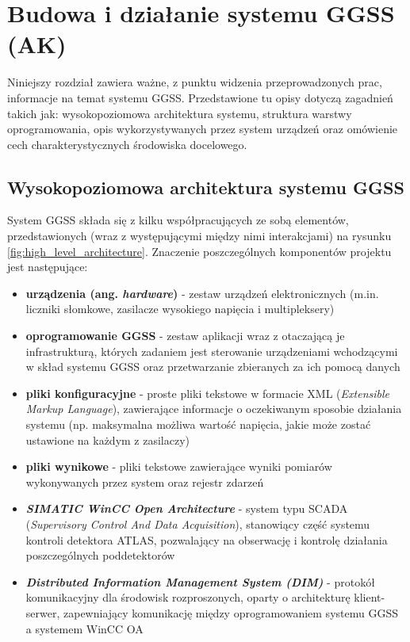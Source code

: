 \chapter{Budowa i działanie systemu GGSS (AK)}
\label{cha:ggss}

\graphicspath{{3_ggss_introduction/static/}}

Niniejszy rozdział zawiera ważne, z punktu widzenia przeprowadzonych prac, informacje na temat systemu GGSS. Przedstawione tu opisy dotyczą zagadnień takich jak: wysokopoziomowa architektura systemu, struktura warstwy oprogramowania, opis wykorzystywanych przez system urządzeń oraz omówienie cech charakterystycznych środowiska docelowego. 

\section{Wysokopoziomowa architektura systemu GGSS}
System GGSS składa się z kilku współpracujących ze sobą elementów, przedstawionych (wraz z występującymi między nimi interakcjami) na rysunku \ref{fig:high_level_architecture}. Znaczenie poszczególnych komponentów projektu jest następujące:
\begin{itemize}
    \item \textbf{urządzenia (ang. \emph{hardware})} - zestaw urządzeń elektronicznych (m.in. liczniki słomkowe, zasilacze wysokiego napięcia i multipleksery)
    \item \textbf{oprogramowanie GGSS} - zestaw aplikacji wraz z otaczającą je infrastrukturą, których zadaniem jest sterowanie urządzeniami wchodzącymi w skład systemu GGSS oraz przetwarzanie zbieranych za ich pomocą danych
    \item \textbf{pliki konfiguracyjne} - proste pliki tekstowe w formacie XML (\emph{Extensible Markup Language}), zawierające informacje o oczekiwanym sposobie działania systemu (np. maksymalna możliwa wartość napięcia, jakie może zostać ustawione na każdym z zasilaczy)
    \item \textbf{pliki wynikowe} - pliki tekstowe zawierające wyniki pomiarów wykonywanych przez system oraz rejestr zdarzeń 
    \item \emph{\textbf{SIMATIC WinCC Open Architecture}} - system typu SCADA (\emph{Supervisory Control And Data Acquisition}), stanowiący część systemu kontroli detektora ATLAS, pozwalający na obserwację i kontrolę działania poszczególnych poddetektorów
    \item \emph{\textbf{Distributed Information Management System (DIM)}} - protokół komunikacyjny dla środowisk rozproszonych, oparty o architekturę klient-serwer, zapewniający komunikację między oprogramowaniem systemu GGSS a systemem WinCC OA
\end{itemize}

